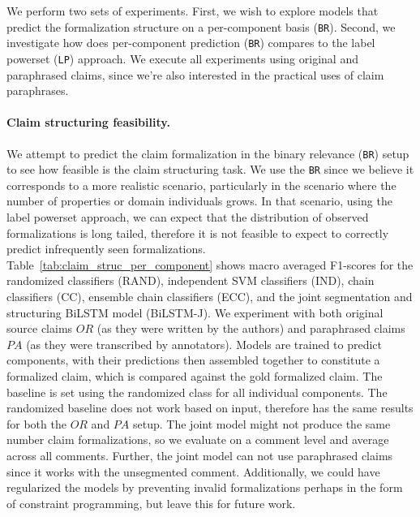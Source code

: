 We perform two sets of experiments. First, we wish to explore models
that predict the formalization structure on a per-component basis (\texttt{BR}). 
Second, we investigate how does per-component prediction (\texttt{BR}) compares to 
the label powerset (\texttt{LP}) approach.
We execute all experiments using original and paraphrased claims, since we're
also interested in the practical uses of claim paraphrases.

\paragraph{Claim structuring feasibility. }
We attempt to predict the claim formalization in the binary
relevance (\texttt{BR}) setup to see how feasible is the claim 
structuring task. We use the \texttt{BR} since we believe it corresponds
to a more realistic scenario, particularly in the scenario where the number
of properties or domain individuals grows. In that scenario, using the
label powerset approach, we can expect that the
distribution of observed formalizations is long tailed, therefore it is not
feasible to expect to correctly predict infrequently seen formalizations.
Table~\ref{tab:claim_struc_per_component} shows macro averaged F1-scores for
the randomized classifiers (RAND), independent SVM classifiers (IND), chain
classifiers (CC), ensemble chain classifiers (ECC), and the joint segmentation
and structuring BiLSTM model (BiLSTM-J). We experiment with both original
source claims $OR$ (as they were written by the authors) and paraphrased claims $PA$ (as
they were transcribed by annotators).
Models are trained to predict components, with their predictions then assembled
together to constitute a formalized claim, which is compared against the gold
formalized claim.  The baseline is set using the randomized 
class for all individual components. The randomized baseline does not work 
based on input, therefore has the same results for both the $OR$ and $PA$ setup. 
The joint model might not produce the same number claim formalizations, 
so we evaluate on a comment level and average across all comments. Further, the joint
model can not use paraphrased claims since it works with the unsegmented comment. 
Additionally, we could have regularized the models by preventing invalid
formalizations perhaps in the form of constraint programming, but leave this
for future work. 

